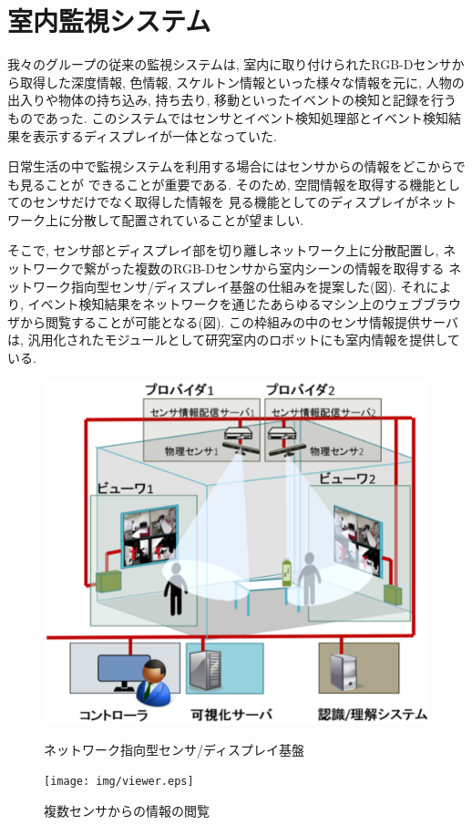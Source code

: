 \section{室内監視システム}
我々のグループの従来の監視システムは, 室内に取り付けられたRGB-Dセンサから取得した深度情報, 色情報, スケルトン情報といった様々な情報を元に, 
人物の出入りや物体の持ち込み, 持ち去り, 移動といったイベントの検知と記録を行うものであった.
このシステムではセンサとイベント検知処理部とイベント検知結果を表示するディスプレイが一体となっていた.
\par

日常生活の中で監視システムを利用する場合にはセンサからの情報をどこからでも見ることが
できることが重要である.
そのため, 空間情報を取得する機能としてのセンサだけでなく取得した情報を
見る機能としてのディスプレイがネットワーク上に分散して配置されていることが望ましい.
\par

そこで, センサ部とディスプレイ部を切り離しネットワーク上に分散配置し, 
ネットワークで繋がった複数のRGB-Dセンサから室内シーンの情報を取得する
ネットワーク指向型センサ/ディスプレイ基盤の仕組みを提案した(図\cite{fig:infra}). 
それにより, イベント検知結果をネットワークを通じたあらゆるマシン上のウェブブラウザから閲覧することが可能となる(図\cite{fig:infra}).
この枠組みの中のセンサ情報提供サーバは, 汎用化されたモジュールとして研究室内のロボットにも室内情報を提供している. 
\begin{figure}[h!]
	\begin{minipage}[b]{0.5\linewidth}
		\includegraphics[width=\textwidth,clip]{img/infra.eps}
		\caption{ネットワーク指向型センサ/ディスプレイ基盤}
		\label{fig:infra}
        \end{minipage}%
	\begin{minipage}[b]{0.5\linewidth}
		\texttt{[image: img/viewer.eps]}
		\caption{複数センサからの情報の閲覧}
		\label{fig:infra}
        \end{minipage}
\end{figure}

